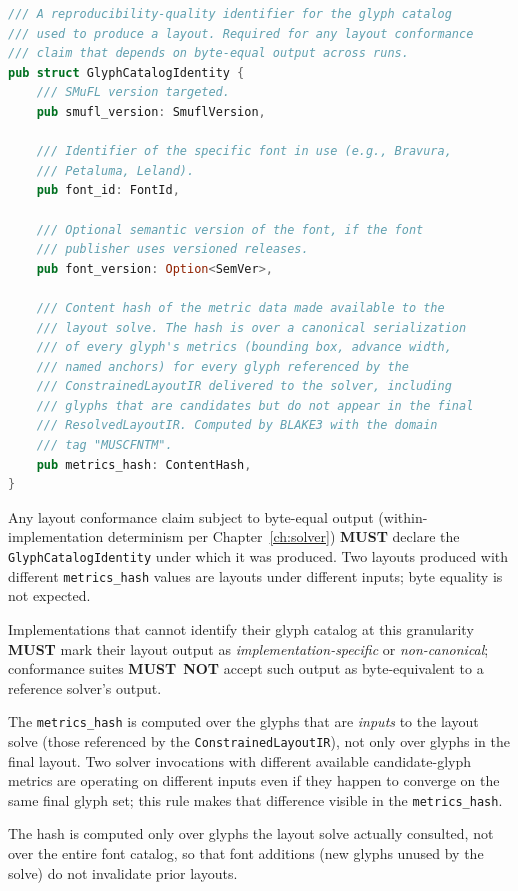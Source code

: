 \documentclass[11pt,letterpaper]{report}
\newcounter{requirement}[chapter]
\newcommand{\MUST}{\textbf{MUST}}
\newcommand{\MUSTNOT}{\textbf{MUST}\nobreak\ \textbf{NOT}}
\begin{document}
\begin{lstlisting}[language=Rust]
/// A reproducibility-quality identifier for the glyph catalog
/// used to produce a layout. Required for any layout conformance
/// claim that depends on byte-equal output across runs.
pub struct GlyphCatalogIdentity {
    /// SMuFL version targeted.
    pub smufl_version: SmuflVersion,

    /// Identifier of the specific font in use (e.g., Bravura,
    /// Petaluma, Leland).
    pub font_id: FontId,

    /// Optional semantic version of the font, if the font
    /// publisher uses versioned releases.
    pub font_version: Option<SemVer>,

    /// Content hash of the metric data made available to the
    /// layout solve. The hash is over a canonical serialization
    /// of every glyph's metrics (bounding box, advance width,
    /// named anchors) for every glyph referenced by the
    /// ConstrainedLayoutIR delivered to the solver, including
    /// glyphs that are candidates but do not appear in the final
    /// ResolvedLayoutIR. Computed by BLAKE3 with the domain
    /// tag "MUSCFNTM".
    pub metrics_hash: ContentHash,
}
\end{lstlisting}

\begin{requirement}
  \label{req:layoutir:glyph-catalog-identity}
  Any layout conformance claim subject to byte-equal output
  (within-implementation determinism per
  Chapter~\ref{ch:solver}) \MUST{} declare the
  \texttt{GlyphCatalogIdentity} under which it was produced.
  Two layouts produced with different \texttt{metrics\_hash}
  values are layouts under different inputs; byte equality is
  not expected.

  Implementations that cannot identify their glyph catalog at
  this granularity \MUST{} mark their layout output as
  \emph{implementation-specific} or \emph{non-canonical};
  conformance suites \MUSTNOT{} accept such output as
  byte-equivalent to a reference solver's output.

  The \texttt{metrics\_hash} is computed over the glyphs that
  are \emph{inputs} to the layout solve (those referenced by the
  \texttt{ConstrainedLayoutIR}), not only over glyphs in the
  final layout. Two solver invocations with different available
  candidate-glyph metrics are operating on different inputs even
  if they happen to converge on the same final glyph set; this
  rule makes that difference visible in the
  \texttt{metrics\_hash}.

  The hash is computed only over glyphs the layout solve
  actually consulted, not over the entire font catalog, so that
  font additions (new glyphs unused by the solve) do not
  invalidate prior layouts.
\end{requirement}
\end{document}
